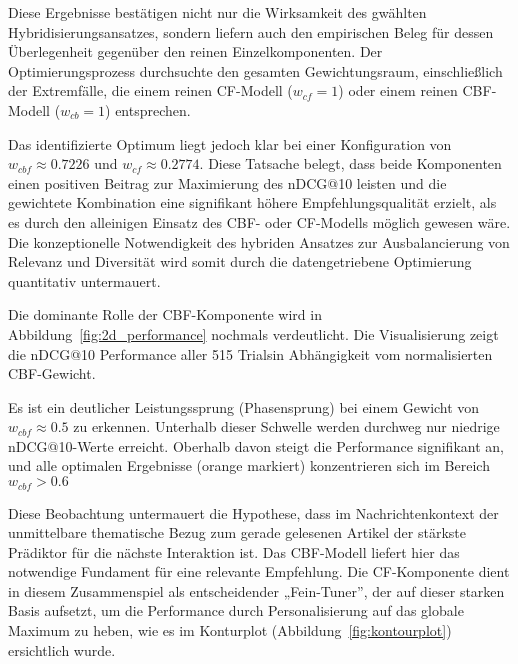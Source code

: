 Diese Ergebnisse bestätigen nicht nur die Wirksamkeit des gwählten
Hybridisierungsansatzes, sondern liefern auch den empirischen Beleg für dessen Überlegenheit gegenüber den reinen
Einzelkomponenten. Der Optimierungsprozess durchsuchte den gesamten Gewichtungsraum, einschließlich der Extremfälle,
die einem reinen \ac{CF}-Modell ($w_{cf} = 1$) oder einem reinen \ac{CBF}-Modell ($w_{cb} = 1$) entsprechen.

Das identifizierte Optimum liegt jedoch klar bei einer Konfiguration von \(w_{cbf} \approx 0.7226\) und
\(w_{cf} \approx 0.2774\). Diese Tatsache belegt, dass beide Komponenten einen positiven Beitrag zur Maximierung
des \ac{nDCG}@10 leisten und die gewichtete Kombination eine signifikant höhere Empfehlungsqualität erzielt, als es durch den
alleinigen Einsatz des \ac{CBF}- oder \ac{CF}-Modells möglich gewesen wäre. Die konzeptionelle Notwendigkeit des hybriden
Ansatzes zur Ausbalancierung von Relevanz und Diversität wird somit durch die datengetriebene Optimierung quantitativ
untermauert.

Die dominante Rolle der \ac{CBF}-Komponente wird in Abbildung~\ref{fig:2d_performance} nochmals verdeutlicht. Die 
Visualisierung zeigt die \ac{nDCG}@10 Performance aller 515 Trialsin Abhängigkeit vom normalisierten \ac{CBF}-Gewicht.

Es ist ein deutlicher Leistungssprung (Phasensprung) bei einem Gewicht von \(w_{cbf} \approx 0.5\) zu erkennen.
Unterhalb dieser Schwelle werden durchweg nur niedrige \ac{nDCG}@10-Werte erreicht. Oberhalb davon steigt die Performance 
signifikant an, und alle optimalen Ergebnisse (orange markiert) konzentrieren sich im Bereich \(w_{cbf} > 0.6\)

Diese Beobachtung untermauert die Hypothese, dass im Nachrichtenkontext der unmittelbare thematische Bezug zum 
gerade gelesenen Artikel der stärkste Prädiktor für die nächste Interaktion ist. 
Das CBF-Modell liefert hier das notwendige Fundament für eine relevante Empfehlung. 
Die CF-Komponente dient in diesem Zusammenspiel als entscheidender „Fein-Tuner”, der auf dieser starken Basis aufsetzt, 
um die Performance durch Personalisierung auf das globale Maximum zu heben, wie es im Konturplot (Abbildung~\ref{fig:kontourplot}) 
ersichtlich wurde.


% 